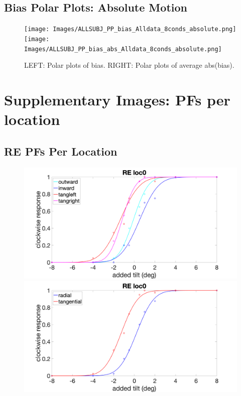 \documentclass[11pt]{article} %
\begin{document}
\subsection{Bias Polar Plots: Absolute Motion}
\begin{figure}[H]
\centering %
\texttt{[image: Images/ALLSUBJ\_PP\_bias\_Alldata\_8conds\_absolute.png]}
\texttt{[image: Images/ALLSUBJ\_PP\_bias\_abs\_Alldata\_8conds\_absolute.png]}
\caption{LEFT: Polar plots of bias. RIGHT: Polar plots of average abs(bias).}
\end{figure}

\newpage
\section{Supplementary Images: PFs per location}
\subsection{RE PFs Per Location}
\begin{figure}[H]
\centering %
\includegraphics[scale=.15]{Images/RE_PF_loc0_4conds.png}
\includegraphics[scale=.15]{Images/RE_PF_loc0_2conds.png}
\end{figure}
\end{document}
